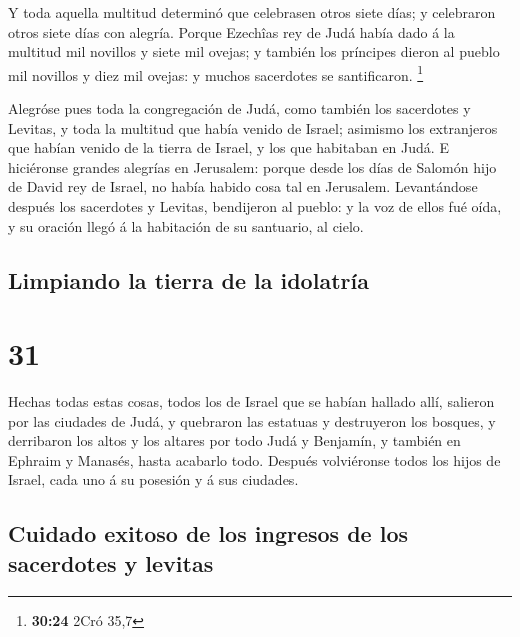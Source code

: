  Y toda aquella multitud determinó que celebrasen otros
siete días; y celebraron otros siete días con alegría. 
Porque Ezechîas rey de Judá había dado á la multitud mil novillos y
siete mil ovejas; y también los príncipes dieron al pueblo mil novillos
y diez mil ovejas: y muchos sacerdotes se santificaron. \footnote{\textbf{30:24}
  2Cró 35,7}

 Alegróse pues toda la congregación de Judá, como también
los sacerdotes y Levitas, y toda la multitud que había venido de Israel;
asimismo los extranjeros que habían venido de la tierra de Israel, y los
que habitaban en Judá.  E hiciéronse grandes alegrías en
Jerusalem: porque desde los días de Salomón hijo de David rey de Israel,
no había habido cosa tal en Jerusalem.  Levantándose
después los sacerdotes y Levitas, bendijeron al pueblo: y la voz de
ellos fué oída, y su oración llegó á la habitación de su santuario, al
cielo.

\hypertarget{limpiando-la-tierra-de-la-idolatruxeda}{%
\subsection{Limpiando la tierra de la
idolatría}\label{limpiando-la-tierra-de-la-idolatruxeda}}

\hypertarget{section-30}{%
\section{31}\label{section-30}}

 Hechas todas estas cosas, todos los de Israel que se habían
hallado allí, salieron por las ciudades de Judá, y quebraron las
estatuas y destruyeron los bosques, y derribaron los altos y los altares
por todo Judá y Benjamín, y también en Ephraim y Manasés, hasta acabarlo
todo. Después volviéronse todos los hijos de Israel, cada uno á su
posesión y á sus ciudades.

\hypertarget{cuidado-exitoso-de-los-ingresos-de-los-sacerdotes-y-levitas}{%
\subsection{Cuidado exitoso de los ingresos de los sacerdotes y
levitas}\label{cuidado-exitoso-de-los-ingresos-de-los-sacerdotes-y-levitas}}

